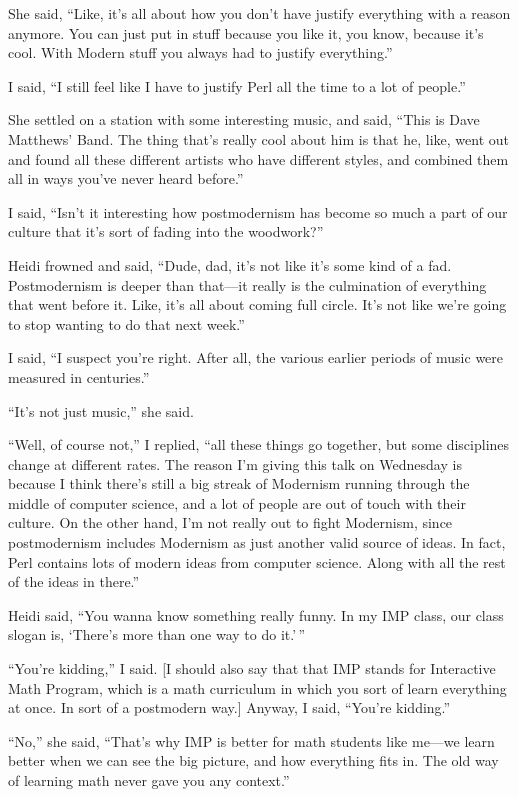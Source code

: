\documentclass[10pt,letterpaper]{article}
\begin{document}
She said, ``Like, it's all about how you don't have justify everything with
a reason anymore. You can just put in stuff because you like it, you know,
because it's cool. With Modern stuff you always had to justify everything.''

I said, ``I still feel like I have to justify Perl all the time to a lot of
people.''

She settled on a station with some interesting music, and said, ``This is
Dave Matthews' Band. The thing that's really cool about him is that he, like,
went out and found all these different artists who have different styles, and
combined them all in ways you've never heard before.''

I said, ``Isn't it interesting how postmodernism has become so much a part
of our culture that it's sort of fading into the woodwork?''

Heidi frowned and said, ``Dude, dad, it's not like it's some kind of a fad.
Postmodernism is deeper than that---it really is the culmination of everything
that went before it. Like, it's all about coming full circle. It's not like
we're going to stop wanting to do that next week.''

I said, ``I suspect you're right. After all, the various earlier periods of
music were measured in centuries.''

``It's not just music,'' she said.

``Well, of course not,'' I replied, ``all these things go together, but
some disciplines change at different rates. The reason I'm giving this talk
on Wednesday is because I think there's still a big streak of Modernism
running through the middle of computer science, and a lot of people are out
of touch with their culture. On the other hand, I'm not really out to fight
Modernism, since postmodernism includes Modernism as just another valid
source of ideas. In fact, Perl contains lots of modern ideas from computer
science. Along with all the rest of the ideas in there.''

Heidi said, ``You wanna know something really funny. In my IMP class, our
class slogan is, `There's more than one way to do it.'\,''

``You're kidding,'' I said. [I should also say that that IMP stands for
Interactive Math Program, which is a math curriculum in which you sort of
learn everything at once. In sort of a postmodern way.] Anyway, I said,
``You're kidding.''

``No,'' she said, ``That's why IMP is better for math students like me---we
learn better when we can see the big picture, and how everything fits in. The
old way of learning math never gave you any context.''
\end{document}
